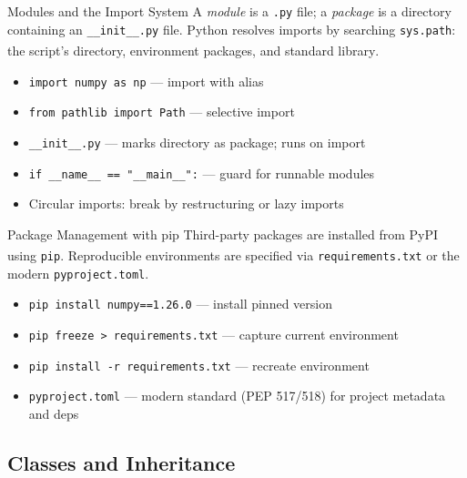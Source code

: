 \begin{v3topic}{Modules and the Import System}
    A \emph{module} is a \texttt{.py} file; a \emph{package} is a directory containing an \texttt{\_\_init\_\_.py} file.
    Python resolves imports by searching \texttt{sys.path}: the script's directory, environment packages, and standard library\textsuperscript{\cite{romanoLearnPythonProgramming2021}}.
\visualseparator
    \begin{itemize}
        \item \texttt{import numpy as np} --- import with alias
        \item \texttt{from pathlib import Path} --- selective import
        \item \texttt{\_\_init\_\_.py} --- marks directory as package; runs on import
        \item \texttt{if \_\_name\_\_ == "\_\_main\_\_":} --- guard for runnable modules
        \item Circular imports: break by restructuring or lazy imports
    \end{itemize}

\end{v3topic}
\begin{v3topic}{Package Management with pip}
    Third-party packages are installed from PyPI using \texttt{pip}\textsuperscript{\cite{romanoLearnPythonProgramming2021}}.
    Reproducible environments are specified via \texttt{requirements.txt} or the modern \texttt{pyproject.toml}.
\visualseparator
    \begin{itemize}
        \item \texttt{pip install numpy==1.26.0} --- install pinned version
        \item \texttt{pip freeze > requirements.txt} --- capture current environment
        \item \texttt{pip install -r requirements.txt} --- recreate environment
        \item \texttt{pyproject.toml} --- modern standard (PEP 517/518) for project metadata and deps
    \end{itemize}
\end{v3topic}

\subsection{Classes and Inheritance}

